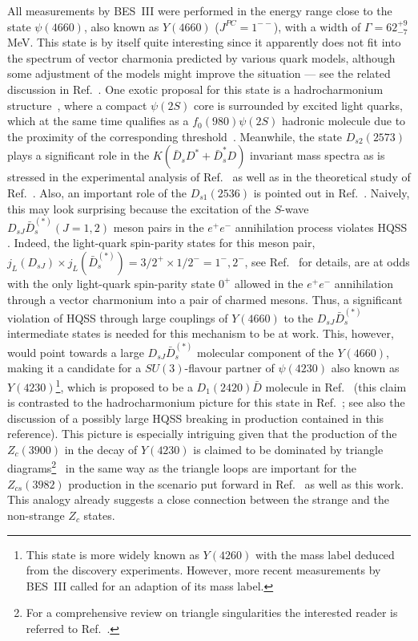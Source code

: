 \documentclass[preprint,12pt,3p]{elsarticle}
\begin{document}
All measurements by BES~III were performed in the energy range close to the state $\psi(4660)$, also known
as $Y(4660)$ ($J^{PC}= 1^{--}$), with a width of $\Gamma = 62^{+9}_{-7}$ MeV. This state is by itself quite interesting
since it apparently does not fit into the spectrum of vector charmonia predicted by various quark models, although
some adjustment of the models might improve the situation --- see the related discussion in Ref.~\cite{Hanhart:2019isz}.
One exotic proposal for this state is a hadrocharmonium structure~\cite{Voloshin:2007dx}, where a compact $\psi(2S)$ core is surrounded by
excited light quarks, which at the same time qualifies as a $f_0(980)\psi(2S)$ hadronic molecule due to the proximity of
the corresponding threshold~\cite{Guo:2008zg}. 
Meanwhile, the state $D_{s2}(2573)$ plays a significant role in the $K(\bar{D}_s D^*+\bar{D}_s^* D)$ invariant mass spectra as is stressed in the experimental analysis of Ref.~\cite{BESIII:2020qkh} as well as in the theoretical study of Ref.~\cite{Yang:2020nrt}. Also, an important role of the $D_{s1}(2536)$ is pointed out in Ref.~\cite{BESIII:2020qkh}.
Naively, this may look surprising because the excitation of the $S$-wave $D_{sJ} \bar{D}_s^{(*)} (J=1,2)$ meson pairs in the $e^+e^-$ annihilation process violates HQSS \cite{Li:2013yka}. Indeed, the light-quark spin-parity states for this meson pair,
$j_L(D_{sJ}) \times j_L(\bar{D}_s^{(*)})= 3/2^+ \times1/2^- = 1^-,
2^-$, see Ref.~\cite{Guo:2014ura} for details, are at odds with the only light-quark spin-parity state $0^+$ allowed in the $e^+e^-$ annihilation through a vector charmonium into a pair of charmed mesons. Thus, a significant violation of HQSS through large couplings of
$Y(4660)$ to the $D_{sJ} \bar{D}_s^{(*)}$ intermediate states is needed for this mechanism to be at work. This, however, would point towards a large $D_{sJ} \bar{D}_s^{(*)}$ molecular component 
of the $Y(4660)$, making it a candidate for a $SU(3)$-flavour partner of $\psi(4230)$ also known as $Y(4230)$\footnote{This state is more widely
known as $Y(4260)$ with the mass label deduced from the discovery experiments. However, more recent measurements
by BES~III called for an adaption of its mass label.}, which is proposed to be a $D_1(2420)\bar D$ molecule in Ref.~\cite{Wang:2013cya}
(this claim is contrasted to the hadrocharmonium picture for this state in Ref.~\cite{Wang:2013kra}; see also the discussion of a possibly large HQSS breaking in production contained in this reference).
This picture is especially intriguing given that the production of the $Z_c(3900)$ in the decay of $Y(4230)$ is claimed to be dominated by triangle 
diagrams\footnote{For a comprehensive review on triangle singularities the interested reader is referred to Ref.~\cite{Guo:2019twa}.}~\cite{Wang:2013cya,Wang:2013hga} in the same way as the triangle loops are important for the $Z_{cs}(3982)$ production in the scenario put forward in Ref.~\cite{Yang:2020nrt} as well as this work. This analogy already suggests a close connection between the strange and the non-strange $Z_c$ states.
\end{document}
